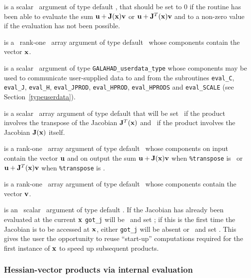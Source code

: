 \documentclass{galahad}
\begin{document}
\begin{description}
 is a scalar \intentout\ argument of type default \integer,
that should be set to 0 if the routine has been able to evaluate the
sum ${\mathbf{u}} + {\mathbf{J}}({\mathbf{x}}) {\mathbf{v}}$ or ${\mathbf{u}} + {\mathbf{J}}^T({\mathbf{x}}){\mathbf{v}}$
and to a non-zero value if the evaluation has not been possible.

 is a \ rank-one \intentin\ array argument of type
default \realdp\ whose components contain the vector ${\mathbf{x}}$.

 is a scalar \intentinout\ argument of type
{\tt GALAHAD\_userdata\_type} whose components may be used
to communicate user-supplied data to and from the subroutines
{\tt eval\_C}, {\tt eval\_J}, {\tt eval\_H}, {\tt eval\_JPROD},
{\tt eval\_HPROD}, {\tt eval\_HPRODS} and {\tt eval\_SCALE}
(see Section~\ref{typeuserdata}).

 is a scalar \intentin\ array argument of type
default that will be set \true\ if the product involves the transpose
of the Jacobian ${\mathbf{J}}^T({\mathbf{x}})$ and \false\ if the product involves
the Jacobian ${\mathbf{J}}({\mathbf{x}})$ itself.

 is a rank-one \intentinout\ array argument of type default \realdp\
whose components on input contain the vector ${\mathbf{u}}$ and on output the
sum ${\mathbf{u}} + {\mathbf{J}}({\mathbf{x}}) {\mathbf{v}}$ when {\tt \%transpose} is \false\ or
${\mathbf{u}} + {\mathbf{J}}^T({\mathbf{x}}) {\mathbf{v}}$ when {\tt \%transpose} is \true.

 is a rank-one \intentin\ array argument of type default \realdp\
whose components contain the vector ${\mathbf{v}}$.

 is an \optional\ scalar \intentin\ argument of type default
\logical. If the Jacobian has already been evaluated at the current ${\mathbf{x}}$
{\tt got\_j} will be \present\ and set \true; if this is the first time
the Jacobian is to be accessed at ${\mathbf{x}}$, either {\tt got\_j} will be absent
or \present\ and set \false. This gives the user the opportunity
to reuse ``start-up'' computations required for the first instance of
${\mathbf{x}}$ to speed up subsequent products.

\end{description}



\subsubsection{Hessian-vector products via internal evaluation\label{hvfv}}
\end{document}
